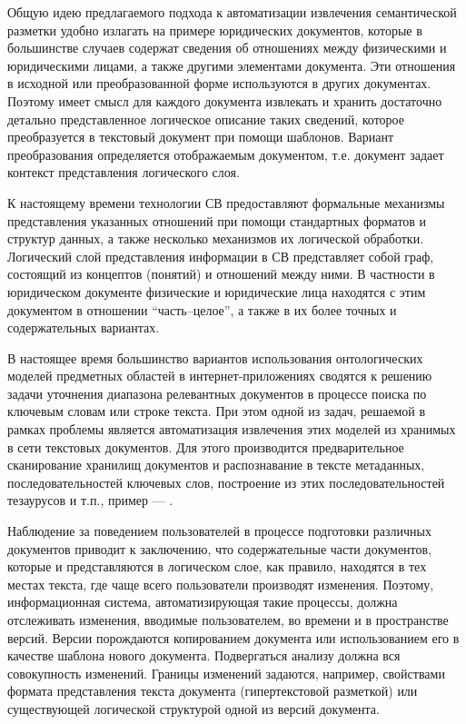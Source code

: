 \documentclass[utf8]{../IncArticle}
\begin{document}
Общую идею предлагаемого подхода к автоматизации извлечения семантической
разметки удобно излагать на примере юридических документов, которые в
большинстве случаев содержат сведения об отношениях между физическими
и юридическими лицами, а также другими элементами документа.  Эти отношения в
исходной или преобразованной форме используются в других документах.
Поэтому имеет смысл для каждого документа извлекать и хранить
достаточно детально представленное логическое описание таких сведений,
которое преобразуется в текстовый документ при помощи шаблонов.
Вариант преобразования определяется отображаемым документом,
т.е. документ задает контекст представления логического слоя.

К настоящему времени технологии СВ предоставляют формальные механизмы
представления указанных отношений при помощи стандартных форматов и
структур данных, а также несколько механизмов их логической обработки.
Логический слой представления информации в СВ представляет собой граф,
состоящий из концептов (понятий) и отношений между ними.  В частности
в юридическом документе физические и юридические лица находятся с этим
документом в отношении ``часть--целое'', а также в их более точных и
содержательных вариантах.

В настоящее время большинство вариантов использования онтологических
моделей предметных областей в интернет-приложениях сводятся к решению задачи уточнения
диапазона релевантных документов в процессе поиска по ключевым словам
или строке текста.  При этом одной из задач, решаемой в рамках
проблемы является автоматизация извлечения этих моделей из хранимых в сети текстовых
документов.   Для этого производится предварительное сканирование
хранилищ документов и распознавание в тексте метаданных, последовательностей
ключевых слов, построение из этих последовательностей тезаурусов и
т.п., пример --- \cite{irina}.

Наблюдение за поведением пользователей в процессе подготовки различных
документов приводит к заключению, что содержательные части документов,
которые и представляются в логическом слое, как правило, находятся в
тех местах текста, где чаще всего пользователи производят изменения.
Поэтому, информационная система, автоматизирующая такие процессы,
должна отслеживать изменения, вводимые пользователем, во времени и в
пространстве версий.  Версии порождаются копированием документа или
использованием его в качестве шаблона нового документа.  Подвергаться
анализу должна вся совокупность изменений.  Границы изменений
задаются, например, свойствами формата представления текста документа
(гипертекстовой разметкой) или существующей логической структурой
одной из версий документа.
\end{document}
